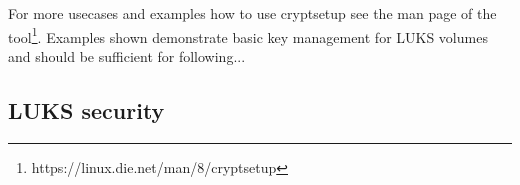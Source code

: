 For more usecases and examples how to use cryptsetup see the man page of the tool\footnote{https://linux.die.net/man/8/cryptsetup}.
Examples shown demonstrate basic key management for LUKS volumes and should be sufficient for following...

\subsection{LUKS security}


\cite{team2012security}
